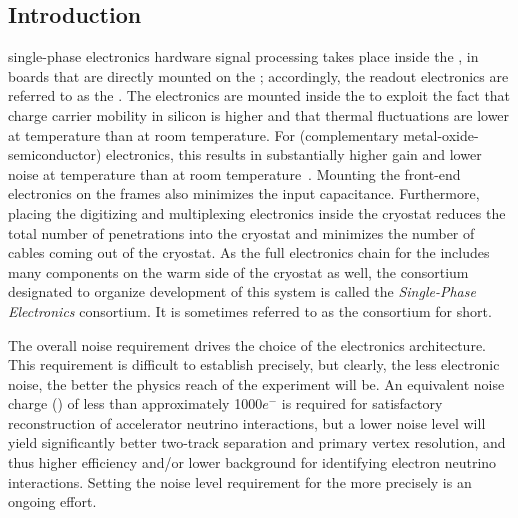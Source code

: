 \subsection{Introduction}
\label{sec:fdsp-tpcelec-overview-intro}


 single-phase  electronics hardware signal processing takes place inside the , in boards that are directly mounted on the ; accordingly, the  readout electronics are referred to as the .  The electronics are mounted inside the  to exploit the fact that charge carrier mobility in silicon is higher and that thermal fluctuations are lower at  temperature than at room temperature.  For  (complementary metal-oxide-semiconductor) electronics, this results in substantially higher gain and lower noise at  temperature than at room temperature~\cite{larCMOS}.  Mounting the front-end electronics on the  frames also minimizes the input capacitance.  Furthermore, placing the digitizing and multiplexing electronics inside the cryostat reduces the total number of penetrations into the cryostat and minimizes the number of cables coming out of the cryostat.  As the full  electronics chain for the  includes many components on the warm side of the cryostat as well, the  consortium designated to organize development of this system is called the  \textit{Single-Phase  Electronics} consortium. It is sometimes referred to as the  consortium for short.

The overall noise requirement drives the choice of the  electronics architecture. This requirement is difficult to establish precisely, but clearly, the less electronic noise, the better the physics reach of the  experiment will be.  An equivalent noise charge () of less than approximately 1000$e^-$ is required for satisfactory reconstruction of accelerator neutrino interactions, but a lower noise level will yield significantly better two-track separation and primary vertex resolution, and thus higher efficiency and/or lower background for identifying electron neutrino interactions.  Setting the noise level requirement for the   more precisely is an ongoing effort.

